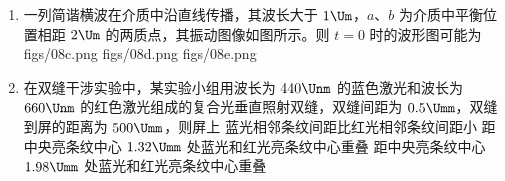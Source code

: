 \documentclass[\gkver]{gaokaozhenti}
\begin{document}
\begin{enumerate}
{故 B 错误；

CD．假设甲、乙都能完全出磁场，对甲根据动量定理有 $-B\overline{I_{1}}L\Delta t=mv_{1}-mv_{0}$，

$q_{1}=\overline{I_{1}}\Delta t=\frac{\Delta\Phi}{R\Delta t}\cdot\Delta t=\frac{\Delta\Phi}{R}=\frac{B\cdot 4L^{2}}{R}$

同理对乙有 $-B\overline{I_{2}}L\Delta t'=mv_{2}-mv_{0}$，$q_{2}=\overline{I_{2}}\Delta t'=\frac{\Delta\Phi}{2R\Delta t'}\cdot\Delta t'=\frac{\Delta\Phi}{2R}=\frac{B\cdot 4L^{2}}{2R}$

解得 $v_{1}=0$，$v_{2}=\frac{1}{2}v_{0}=\frac{2B^{2}L^{3}}{mR}$

故甲恰好完全出磁场区域，乙完全出磁场区域时，速度大小不为 $0$；由能量守恒可知甲、乙线框从刚进磁场区域到完全出磁场区域产生的焦耳热分别为 $Q_{1}=\frac{1}{2}mv_{0}^{2}$，$Q_{2}=\frac{1}{2}mv_{0}^{2}-\frac{1}{2}m\left(\frac{v_{0}}{2}\right)^{2}=\frac{3}{8}mv_{0}^{2}$

即 $\frac{Q_{1}}{Q_{2}}=\frac{4}{3}$；

故 C 错误，D 正确。

故选 D。
}

\item
一列简谐横波在介质中沿直线传播，其波长大于 $1 \Um$，$a$、$b$ 为介质中平衡位置相距 $2 \Um$ 的两质点，其振动图像如图所示。则 $t=0$ 时的波形图可能为
\onepicture[w=5.00cm, h=3.75cm]{}
{figs/08c.png}
{figs/08d.png}
{figs/08e.png}

\item
在双缝干涉实验中，某实验小组用波长为 $440 \Unm$ 的蓝色激光和波长为 $660 \Unm$ 的红色激光组成的复合光垂直照射双缝，双缝间距为 $0.5 \Umm$，双缝到屏的距离为 $500 \Umm$，则屏上
{蓝光相邻条纹间距比红光相邻条纹间距小}
{距中央亮条纹中心 $1.32 \Umm$ 处蓝光和红光亮条纹中心重叠}
{距中央亮条纹中心 $1.98 \Umm$ 处蓝光和红光亮条纹中心重叠}
\end{enumerate}
\end{document}
